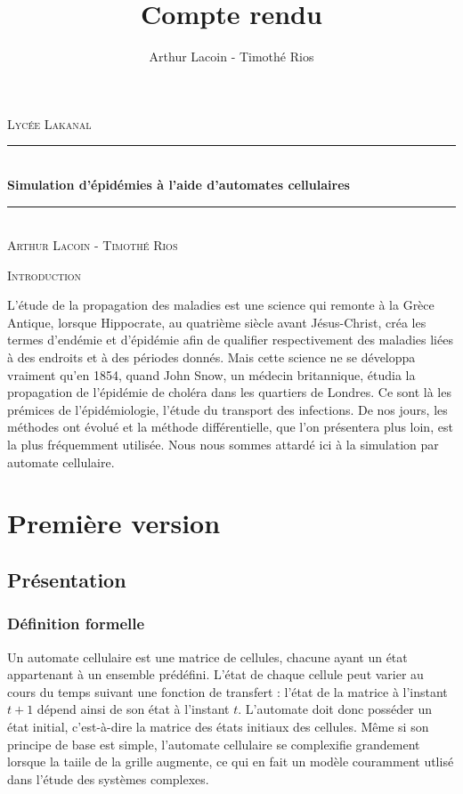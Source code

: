 \documentclass{article}
\title{Compte rendu}
\author{Arthur Lacoin - Timothé Rios}
\date{}
\newcommand{\HRule}{\rule{\linewidth}{0.5mm}}
\begin{document}
\begin{titlepage}
    \begin{sffamily}
    \begin{center}

        \textsc{\LARGE Lycée Lakanal}~\\[2cm]

        \HRule \\[0.4cm]
        { \huge \bfseries Simulation d'épidémies à l'aide d'automates cellulaires\\[0.4cm] }
        \HRule \\[2cm]
        \textsc{\Large Arthur Lacoin - Timothé Rios}\\[2cm]

    \end{center}
\end{sffamily}
\end{titlepage}

\tableofcontents

\newpage

\begin{center}
\textsc{Introduction}~\\[1cm]
\end{center}

	L'étude de la propagation des maladies est une science qui remonte à la Grèce Antique, lorsque Hippocrate, au quatrième siècle avant Jésus-Christ, créa les termes d'endémie et d'épidémie afin de qualifier respectivement des maladies liées à des endroits et à des périodes donnés. Mais cette science ne se développa vraiment qu'en 1854, quand John Snow, un médecin britannique, étudia la propagation de l'épidémie de choléra dans les quartiers de Londres. Ce sont là les prémices de l'épidémiologie, l'étude du transport des infections. De nos jours, les méthodes ont évolué et la méthode différentielle, que l'on présentera plus loin, est la plus fréquemment utilisée. Nous nous sommes attardé ici à la simulation par automate cellulaire.

\section{Première version}

\subsection{Présentation}

\subsubsection{Définition formelle}
	Un automate cellulaire est une matrice de cellules, chacune ayant un état appartenant à un ensemble prédéfini. L'état de chaque cellule peut varier au cours du temps suivant une fonction de transfert : l'état de la matrice à l'instant $t+1$ dépend ainsi de son état à l'instant $t$. L'automate doit donc posséder un état initial, c'est-à-dire la matrice des états initiaux des cellules. Même si son principe de base est simple, l'automate cellulaire se complexifie grandement lorsque la taiile de la grille augmente, ce qui en fait un modèle couramment utlisé dans l'étude des systèmes complexes.
\end{document}
